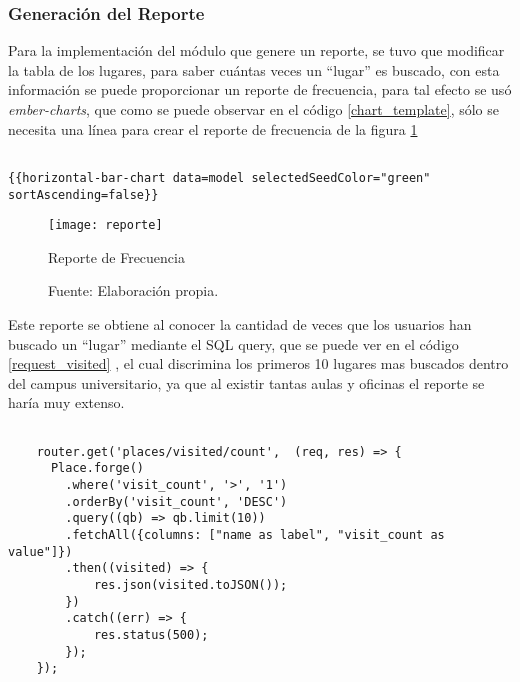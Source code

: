 \subsubsection{Generación del Reporte}

Para la implementación del módulo que genere un reporte, se tuvo que modificar la tabla de los lugares, para saber cuántas veces un ``lugar'' es buscado, con esta información se puede proporcionar un reporte de frecuencia, para tal efecto se usó \emph{ember-charts}, que como se puede observar en el código \ref{chart_template}, sólo se necesita una línea para crear el reporte de frecuencia de la figura \ref{fig:reporte} \\

\begin{center}
  \begin{lstlisting}[label=chart_template,caption=Componente de \emph{Ember-charts}.]

{{horizontal-bar-chart data=model selectedSeedColor="green" sortAscending=false}}

  \end{lstlisting}
\end{center}

\begin{figure}[H]
      \begin{center}
        \texttt{[image: reporte]}

        \caption{Reporte de Frecuencia}
        \label{fig:reporte}
        \caption*{Fuente: Elaboración propia.}
      \end{center}
\end{figure}



Este reporte se obtiene al conocer la cantidad de veces que los usuarios han buscado un ``lugar'' mediante el SQL query, que se puede ver en el código \ref{request_visited} , el cual discrimina los primeros 10 lugares mas buscados dentro del campus universitario, ya que al existir tantas aulas y oficinas el reporte se haría muy extenso. \\

\begin{center}
  \begin{lstlisting}[label=request_visited,caption=Insertar un ``lugar'' en la base de datos.]

    router.get('places/visited/count',  (req, res) => {
      Place.forge()
        .where('visit_count', '>', '1')
        .orderBy('visit_count', 'DESC')
        .query((qb) => qb.limit(10))
        .fetchAll({columns: ["name as label", "visit_count as value"]})
        .then((visited) => {
            res.json(visited.toJSON());
        })
        .catch((err) => {
            res.status(500);
        });
    });

  \end{lstlisting}
\end{center}
